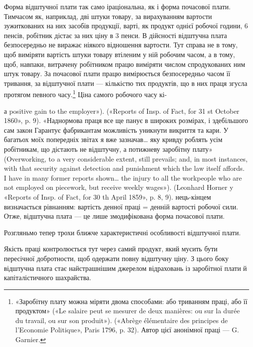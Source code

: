 Форма відштучної плати так само іраціональна, як і форма
почасової плати. Тимчасом як, наприклад, дві штуки товару,
за вирахуванням вартости зужиткованих на них засобів продукції,
варті, як продукт однієї робочої години, 6 пенсів, робітник дістає
за них ціну в 3 пенси. В дійсності відштучна плата безпосередньо
не виражає ніякого відношення вартости. Тут справа не в тому,
щоб виміряти вартість штуки товару втіленим у ній робочим
часом, а в тому, щоб, навпаки, витрачену робітником працю виміряти
числом спродукованих ним штук товару. За почасової
плати працю вимірюється безпосередньо часом її тривання, за
відштучної плати — кількістю тих продуктів, що в них праця
згусла протягом певного часу.\footnote{
«Заробітну плату можна міряти двома способами: або триванням
праці, або її продуктом» («Le salaire peut se mesurer de deux manières:
ou sur la durée du travail, ou sur son produit»). («Abrège élémentaire des
principes de l’Economie Politique», Paris 1796, p. 32). Автор цієї анонімної
праці — G. Garnier.
} Ціна самого робочого часу кі-

а positive gain to the employer»). («Reports of Insp. of Fact, for 31 st
October 1860», p. 9). «Наднормова праця все ще панує в широких розмірах,
і здебільшого сам закон Гарантує фабрикантам можливість уникнути
викриття та кари. У багатьох моїх попередніх звітах я вже зазначав\dots{}
яку кривду роблять усім робітникам, що дістають не відштучну, а потижневу
заробітну плату» (Overworking, to a very considerable extent,
still prevails; and, in most instances, with that security against detection
and punishment which the law itself affords. I have in many former reports
shown\dots{} the injury to all the workpeople who are not employed on piecework,
but receive weekly wages»). (Leonhard Horner y «Reports of Insp.
of Fact, for 30 th April 1859», p. 8, 9).
нець-кінцем визначається рівнанням: вартість денної праці =
денній вартості робочої сили. Отже, відштучна плата — це лише
змодифікована форма почасової плати.

Розгляньмо тепер трохи ближче характеристичні особливості
відштучної плати.

Якість праці контролюється тут через самий продукт, який
мусить бути пересічної добротности, щоб одержати повну відштучну
ціну. З цього боку відштучна плата стає найстрашнішим
джерелом відраховань із заробітної плати й капіталістичного
шахрайства.

